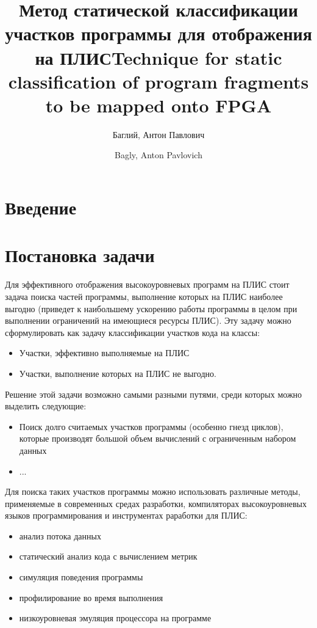 \documentclass[utf8]{psta}%
\title[Статическая классификация программ для ПЛИС]{Метод статической классификации участков программы для отображения на ПЛИС}
\author{Баглий, Антон Павлович}
\title[Static program classification for FPGA]{Technique for static classification of program fragments to be mapped onto FPGA}
\author{Bagly, Anton Pavlovich}
\begin{document}
           
\maketitle   
\section*{Введение}

\section{Постановка задачи} 

Для эффективного отображения высокоуровневых программ на ПЛИС стоит задача поиска частей программы, выполнение которых на ПЛИС наиболее выгодно (приведет к наибольшему ускорению работы программы в целом при выполнении ограничений на имеющиеся ресурсы ПЛИС).
Эту задачу можно сформулировать как задачу классификации участков кода на классы:

\begin{itemize}
    \item Участки, эффективно выполняемые на ПЛИС
    \item Участки, выполнение которых на ПЛИС не выгодно.
\end{itemize}

Решение этой задачи возможно самыми разными путями, среди которых можно выделить следующие:

\begin{itemize}
    \item Поиск долго считаемых участков программы (особенно гнезд циклов), которые производят большой объем вычислений с ограниченным набором данных
    \item ...
\end{itemize}

Для поиска таких участков программы можно использовать различные методы, применяемые в современных средах разработки, компиляторах высокоуровневых языков программирования и инструментах раработки для ПЛИС:

\begin{itemize}
    \item анализ потока данных
    \item статический анализ кода с вычислением метрик
    \item симуляция поведения программы
    \item профилирование во время выполнения
    \item низкоуровневая эмуляция процессора на программе
\end{itemize}
\end{document}
